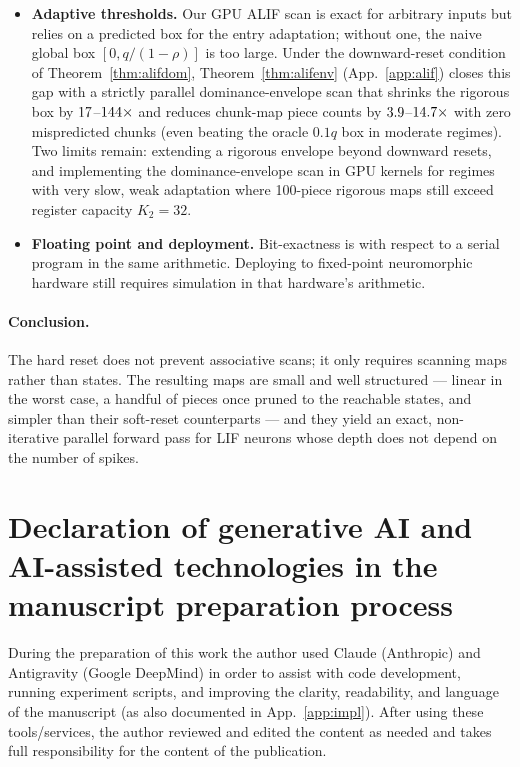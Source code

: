 \documentclass[10pt]{article}
\theoremstyle{remark}
\begin{document}
\begin{itemize}[leftmargin=*]
\item \textbf{Adaptive thresholds.} Our GPU ALIF scan is exact for arbitrary inputs but relies on a predicted box for the entry adaptation; without one, the naive global box $[0,q/(1-\rho)]$ is too large. Under the downward-reset condition of Theorem~\ref{thm:alifdom}, Theorem~\ref{thm:alifenv} (App.~\ref{app:alif}) closes this gap with a strictly parallel dominance-envelope scan that shrinks the rigorous box by $17$--$144\times$ and reduces chunk-map piece counts by $3.9$--$14.7\times$ with zero mispredicted chunks (even beating the oracle $0.1q$ box in moderate regimes). Two limits remain: extending a rigorous envelope beyond downward resets, and implementing the dominance-envelope scan in GPU kernels for regimes with very slow, weak adaptation where 100-piece rigorous maps still exceed register capacity $K_2=32$.
\item \textbf{Floating point and deployment.} Bit-exactness is with respect to a serial program in the same arithmetic. Deploying to fixed-point neuromorphic hardware still requires simulation in that hardware's arithmetic.
\end{itemize}

\paragraph{Conclusion.}
The hard reset does not prevent associative scans; it only requires scanning maps rather than states. The resulting maps are small and well structured --- linear in the worst case, a handful of pieces once pruned to the reachable states, and simpler than their soft-reset counterparts --- and they yield an exact, non-iterative parallel forward pass for LIF neurons whose depth does not depend on the number of spikes.

\section*{Declaration of generative AI and AI-assisted technologies in the manuscript preparation process}
During the preparation of this work the author used Claude (Anthropic) and Antigravity (Google DeepMind) in order to assist with code development, running experiment scripts, and improving the clarity, readability, and language of the manuscript (as also documented in App.~\ref{app:impl}). After using these tools/services, the author reviewed and edited the content as needed and takes full responsibility for the content of the publication.
\end{document}

